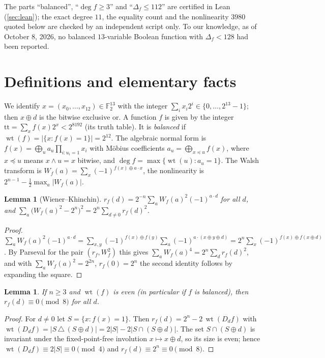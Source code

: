 \documentclass[11pt]{article}
\numberwithin{equation}{section}
\newtheorem{lemma}[theorem]{Lemma}
\theoremstyle{definition}
\theoremstyle{remark}
\newcommand{\F}{\mathbb F}
\DeclareMathOperator{\wt}{wt}
\begin{document}
The parts ``balanced'', ``$\deg f\ge 3$'' and ``$\Delta_f\le 112$'' are certified in Lean
(\cref{sec:lean}); the exact degree $11$, the equality count and the nonlinearity $3980$ quoted below are
checked by an independent script only. To our knowledge, as of October 8, 2026, no balanced
$13$-variable Boolean function with $\Delta_f<128$ had been reported.

\section{Definitions and elementary facts}\label{sec:defs}

We identify $x=(x_0,\dots,x_{12})\in\F_2^{13}$ with the integer $\sum_i x_i2^i\in\{0,\dots,2^{13}-1\}$;
then $x\oplus d$ is the bitwise exclusive or. A function $f$ is given by the integer
$\mathrm{tt}=\sum_x f(x)2^x<2^{8192}$ (its truth table). It is \emph{balanced} if $\wt(f)=|\{x:f(x)=1\}|=2^{12}$.
The algebraic normal form is $f(x)=\bigoplus_{u}a_u\prod_{i:u_i=1}x_i$ with Möbius coefficients
$a_u=\bigoplus_{x\preceq u}f(x)$, where $x\preceq u$ means $x\wedge u=x$ bitwise, and
$\deg f=\max\{\wt(u):a_u=1\}$. The Walsh transform is $W_f(a)=\sum_x(-1)^{f(x)\oplus a\cdot x}$, the
nonlinearity is $2^{n-1}-\tfrac12\max_a|W_f(a)|$.

\begin{lemma}[Wiener--Khinchin]\label{lem:WK}
$r_f(d)=2^{-n}\sum_{a}W_f(a)^2(-1)^{a\cdot d}$ for all $d$, and
$\sum_{a}\bigl(W_f(a)^2-2^n\bigr)^2=2^n\sum_{d\neq0}r_f(d)^2$.
\end{lemma}
\begin{proof}
$\sum_a W_f(a)^2(-1)^{a\cdot d}=\sum_{x,y}(-1)^{f(x)\oplus f(y)}\sum_a(-1)^{a\cdot(x\oplus y\oplus d)}
=2^n\sum_x(-1)^{f(x)\oplus f(x\oplus d)}$. By Parseval for the pair $(r_f,W_f^2)$ this gives
$\sum_aW_f(a)^4=2^n\sum_d r_f(d)^2$, and with $\sum_aW_f(a)^2=2^{2n}$, $r_f(0)=2^n$ the second identity
follows by expanding the square.
\end{proof}

\begin{lemma}\label{lem:mod8}
If $n\ge3$ and $\wt(f)$ is even (in particular if $f$ is balanced), then $r_f(d)\equiv0\pmod 8$ for all $d$.
\end{lemma}
\begin{proof}
For $d\neq0$ let $S=\{x:f(x)=1\}$. Then $r_f(d)=2^n-2\,\wt(D_df)$ with
$\wt(D_df)=|S\,\triangle\,(S\oplus d)|=2|S|-2|S\cap(S\oplus d)|$. The set $S\cap(S\oplus d)$ is invariant
under the fixed-point-free involution $x\mapsto x\oplus d$, so its size is even; hence
$\wt(D_df)\equiv 2|S|\equiv0\pmod 4$ and $r_f(d)\equiv 2^n\equiv0\pmod 8$.
\end{proof}
\end{document}
